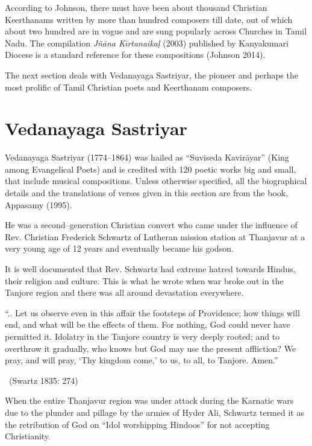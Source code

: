According to Johnson, there must have been about thousand Christian Keerthanams written by more than hundred composers till date, out of which about two hundred are in vogue and are sung popularly across Churches in Tamil Nadu. The compilation \textit{Jñāna Kīrtanaikaḷ} (2003) published by Kanyakumari Diocese is a standard reference for these compositions (Johnson 2014).

The next section deals with Vedanayaga Sastriyar, the pioneer and perhaps the most prolific of Tamil Christian poets and Keerthanam composers.


\section*{Vedanayaga Sastriyar}

Vedanayaga Sastriyar (1774–1864) was hailed as “Suviseda Kavirāyar” (King among Evangelical Poets) and is credited with 120 poetic works big and small, that include musical compositions. Unless otherwise specified, all the biographical details and the translations of verses given in this section are from the book, Appasamy (1995).

He was a second–generation Christian convert who came under the influence of Rev. Christian Frederick Schwartz of Lutheran mission station at Thanjavur at a very young age of 12 years and eventually became his godson.

It is well documented that Rev. Schwartz had extreme hatred towards Hindus, their religion and culture. This is what he wrote when war broke out in the Tanjore region and there was all around devastation everywhere.

\begin{myquote}
“.. Let us observe even in this affair the footsteps of Providence; how things will end, and what will be the effects of them. For nothing, God could never have permitted it. Idolatry in the Tanjore country is very deeply rooted; and to overthrow it gradually, who knows but God may use the present affliction? We pray, and will pray, ‘Thy kingdom come,’ to us, to all, to Tanjore. Amen.” 

~\hfill (Swartz 1835: 274)
\end{myquote}

When the entire Thanjavur region was under attack during the Karnatic wars due to the plunder and pillage by the armies of Hyder Ali, Schwartz termed it as the retribution of God on “Idol worshipping Hindoos” for not accepting Christianity.

